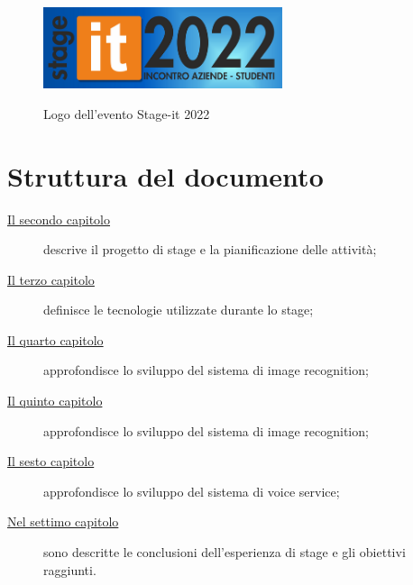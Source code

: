 	\begin{figure}[H]
		\centering
		\includegraphics[width=7cm]{immagini/stageit.png} \\
		\caption{\label{fig:logo_stageit} Logo dell'evento Stage-it 2022}
	\end{figure}

\section{Struttura del documento}

	\begin{description}
	    \item[{\hyperref[cap:descrizione-stage]{Il secondo capitolo}}] descrive il progetto di stage e la pianificazione delle attività;
	    
		\item[{\hyperref[cap:tecnologie]{Il terzo capitolo}}] definisce le tecnologie utilizzate durante lo stage;
		
		\item[{\hyperref[cap:applicazione]{Il quarto capitolo}}] approfondisce lo sviluppo del sistema di image recognition;
	    
	    \item[{\hyperref[cap:rekognition]{Il quinto capitolo}}] approfondisce lo sviluppo del sistema di image recognition;
	    
	    \item[{\hyperref[cap:lex]{Il sesto capitolo}}] approfondisce lo sviluppo del sistema di voice service;
	   
	    \item[{\hyperref[cap:conclusioni]{Nel settimo capitolo}}] sono descritte le conclusioni dell'esperienza di stage e gli obiettivi raggiunti.
	\end{description}




